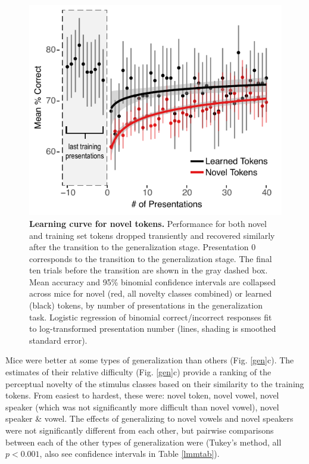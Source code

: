 \documentclass[11pt]{article}\usepackage[]{graphicx}\usepackage[]{color}
\begin{document}
\begin{figure}[t]
\includegraphics[width=\linewidth]{../figures/Figure3.pdf}
\caption{\textbf{Learning curve for novel tokens.} Performance for both novel and training set tokens dropped transiently and recovered similarly after the transition to the generalization stage. Presentation 0 corresponds to the transition to the generalization stage. The final ten trials before the transition are shown in the gray dashed box. Mean accuracy and 95\% binomial confidence intervals are collapsed across mice for novel (red, all novelty classes combined) or learned (black) tokens, by number of presentations in the generalization task. Logistic regression of binomial correct/incorrect responses fit to log-transformed presentation number (lines, shading is smoothed standard error).}
\label{lc}
\end{figure}

Mice were better at some types of generalization than others (Fig. \ref{gen}c). The estimates of their relative difficulty (Fig. \ref{gen}c) provide a ranking of the perceptual novelty of the stimulus classes based on their similarity to the training tokens. From easiest to hardest, these were: novel token, novel vowel, novel speaker (which was not significantly more difficult than novel vowel), novel speaker \& vowel. The effects of generalizing to novel vowels and novel speakers were not significantly different from each other, but pairwise comparisons between each of the other types of generalization were (Tukey's method, all $p < 0.001$, also see confidence intervals in Table \ref{lmmtab}).
\end{document}
